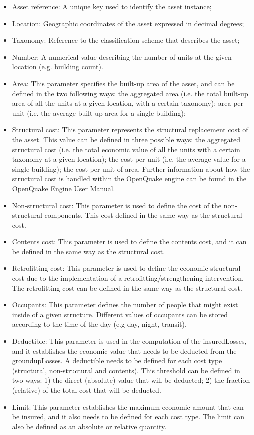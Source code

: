 \begin{itemize}
\item Asset reference: A unique key used to identify the \gls{asset} instance;
\item Location: Geographic coordinates of the \gls{asset} expressed in decimal degrees;
\item Taxonomy: Reference to the classification scheme that describes the \gls{asset};
\item Number: A numerical value describing the number of units at the given location (e.g. building count).
\item Area: This parameter specifies the built-up area of the asset, and can be defined in the two following ways: the aggregated area (i.e. the total built-up area of all the units at a given location, with a certain \gls{taxonomy}); area per unit (i.e. the average built-up area for a single building);
\item Structural cost: This parameter represents the structural replacement cost of the \gls{asset}. This value can be defined in three possible ways: the aggregated structural cost (i.e. the total economic value of all the units with a certain \gls{taxonomy} at a given location); the cost per unit (i.e. the average value for a single building); the cost per unit of area. Further information about how the structural cost is handled within the OpenQuake engine can be found in the OpenQuake Engine User Manual.
\item Non-structural cost: This parameter is used to define the cost of the non-structural components. This cost defined in the same way as the structural cost.
\item Contents cost: This parameter is used to define the contents cost, and it can be defined in the same way as the structural cost.
\item Retrofitting cost: This parameter is used to define the economic structural cost due to the implementation of a retrofitting/strengthening intervention. The retrofitting cost can be defined in the same way as the structural cost.
\item Occupants: This parameter defines the number of people that might exist inside of a given structure. Different values of occupants can be stored according to the time of the day (e.g day, night, transit).  
\item Deductible: This parameter is used in the computation of the \gls{insuredLosses}, and it establishes the economic value that needs to be deducted from the \gls{groundupLosses}. A \gls{deductible} needs to be defined for each cost type (structural, non-structural and contents). This threshold can be defined in two ways: 1) the direct (absolute) value that will be deducted; 2) the fraction (relative) of the total cost that will be deducted. 
\item Limit: This parameter establishes the maximum economic amount that can be insured, and it also needs to be defined for each cost type. The limit can also be defined as an absolute or relative quantity.  
\end{itemize}


